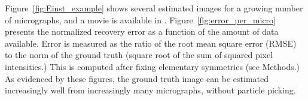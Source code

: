 \documentclass[english,11pt]{article}
\newcommand{\1}{\mathbf{1}}
\newcommand{\TODO}[1]{{\color{red}{[#1]}}}
\numberwithin{equation}{section}
\theoremstyle{plain}
\theoremstyle{definition}
\theoremstyle{remark}
\theoremstyle{plain}
\theoremstyle{remark}
\theoremstyle{plain}
\theoremstyle{plain}
\begin{document}

Figure~\ref{fig:Einst_example} shows several estimated images for a growing number of micrographs, and a movie is available in \TODO{supplementary material}. Figure~\ref{fig:error_per_micro} presents the normalized recovery error as a function of the amount of data available. Error is measured as the ratio of the root mean square error (RMSE) to the norm of the ground truth (square root of the sum of squared pixel intensities.) This is computed after fixing elementary symmetries (see Methods.) As evidenced by these figures, the ground truth image can be estimated increasingly well from increasingly many micrographs, without particle picking.
\TODO{Tamir: I will rewrite it with the new experiment.}
\TODO{Here the cryo-EM setup shows up}


\end{document}

